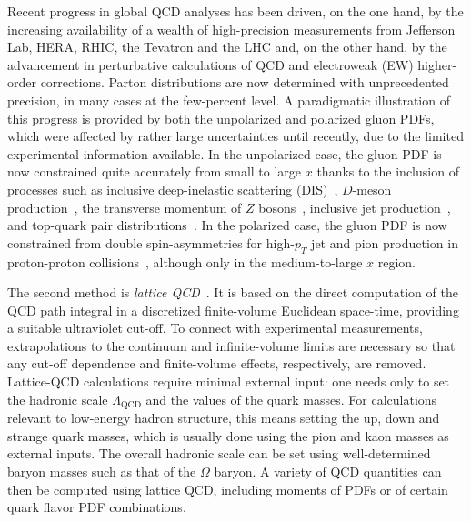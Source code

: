 Recent progress in global QCD analyses has been driven, on the one hand, 
by the increasing availability of a wealth of high-precision measurements from 
Jefferson Lab, HERA, RHIC, the Tevatron and the LHC and, on the other hand, 
by the advancement in perturbative calculations of QCD and 
electroweak (EW) higher-order corrections.
%
Parton distributions are now determined with unprecedented precision, 
in many cases at the few-percent level.
%
A paradigmatic illustration of this progress is provided by both the 
unpolarized and polarized gluon PDFs, which were affected by rather large 
uncertainties until recently, due to the limited experimental information 
available.
%
In the unpolarized case, the gluon PDF is now constrained quite accurately from 
small to large $x$ thanks to the inclusion of processes such as 
inclusive deep-inelastic scattering (DIS)~\cite{Abramowicz:2015mha}, 
$D$-meson production~\cite{Zenaiev:2015rfa,Gauld:2016kpd},
the transverse momentum of $Z$ bosons~\cite{Boughezal:2017nla},
inclusive jet production~\cite{Currie:2016bfm}, and top-quark pair
distributions~\cite{Czakon:2016olj,Guzzi:2014wia}.
%
In the polarized case, the gluon PDF is now constrained from double 
spin-asymmetries for high-$p_T$ jet and pion production in proton-proton 
collisions~\cite{deFlorian:2014yva,Nocera:2014gqa}, 
although only in the medium-to-large $x$ region.

The second method is {\it lattice QCD}~\cite{Olive:2016xmw,Gupta:1997nd}.
%
It is based on the direct computation of the QCD path integral in a 
discretized finite-volume Euclidean space-time, providing a suitable 
ultraviolet cut-off.
%
To connect with experimental measurements, extrapolations to the 
continuum and infinite-volume limits are necessary so that any  
cut-off dependence and finite-volume effects, respectively, are removed.
%
Lattice-QCD calculations require minimal external input: one needs only to 
set the hadronic scale $\Lambda_\text{QCD}$ and the values of the quark masses.
%
For calculations relevant to low-energy hadron structure, this means
setting the up, down and strange quark masses,
which is usually done using the pion and kaon masses as external inputs.
%
The overall hadronic scale can be set using well-determined baryon masses 
such as that of the $\Omega$ baryon.
%
A variety of QCD quantities can then be computed using lattice QCD, including
moments of PDFs or of certain quark flavor PDF combinations.

